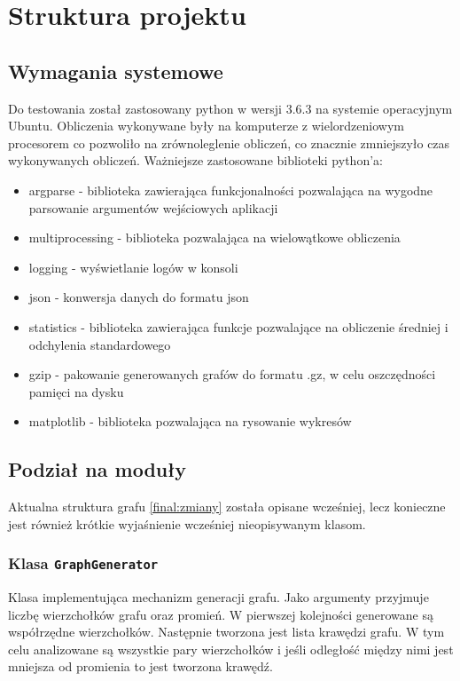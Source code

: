 
\section{Struktura projektu}
	\label{final:struktura}

	\subsection{Wymagania systemowe}
		\label{final:struktura:wymagania}

		Do testowania został zastosowany python w wersji 3.6.3 na systemie operacyjnym Ubuntu. Obliczenia wykonywane były na komputerze z wielordzeniowym procesorem co pozwoliło na zrównoleglenie obliczeń, co znacznie zmniejszyło czas wykonywanych obliczeń. Ważniejsze zastosowane biblioteki python'a:
		\begin{itemize}
			\item argparse - biblioteka zawierająca funkcjonalności pozwalająca na wygodne parsowanie argumentów wejściowych aplikacji
			\item multiprocessing - biblioteka pozwalająca na wielowątkowe obliczenia
			\item logging - wyświetlanie logów w konsoli
			\item json - konwersja danych do formatu json
			\item statistics - biblioteka zawierająca funkcje pozwalające na obliczenie średniej i odchylenia standardowego
			\item gzip - pakowanie generowanych grafów do formatu .gz, w celu oszczędności pamięci na dysku
			\item matplotlib - biblioteka pozwalająca na rysowanie wykresów
		\end{itemize}

	\subsection{Podział na moduły}
		\label{final:struktura:klasy}


		Aktualna struktura grafu \ref{final:zmiany} została opisane wcześniej, lecz konieczne jest również krótkie wyjaśnienie wcześniej nieopisywanym klasom.
		\subsubsection{Klasa \texttt{GraphGenerator}}
			Klasa implementująca mechanizm generacji grafu. Jako argumenty przyjmuje liczbę wierzchołków grafu oraz promień. W pierwszej kolejności generowane są współrzędne wierzchołków. Następnie tworzona jest lista krawędzi grafu. W tym celu analizowane są wszystkie pary wierzchołków i jeśli odległość między nimi jest mniejsza od promienia to jest tworzona krawędź.
